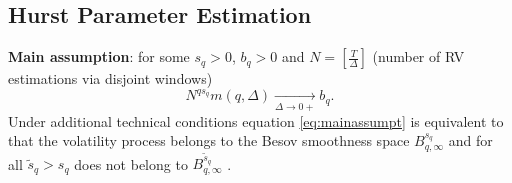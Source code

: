     \subsection{Hurst Parameter Estimation}
        \textbf{Main assumption}: for some $s_q > 0 $, $b_q > 0$ and $N = \left[\frac{T}{\Delta}\right]$ 
        (number of RV estimations via disjoint windows)
        \begin{equation}\label{eq:mainassumpt}
            N^{qs_q} m(q, \Delta) \xrightarrow[\Delta \to 0+]{} b_q.
        \end{equation}
        Under additional technical conditions equation \eqref{eq:mainassumpt} is equivalent to that the volatility process 
        belongs to the Besov smoothness space $B^{s_q}_{q, \infty}$ and for all $\tilde{s}_q > s_q$ does not belong to 
        $B^{\tilde{s}_q}_{q, \infty}$ \cite{ROSENBAUM20081434}.

